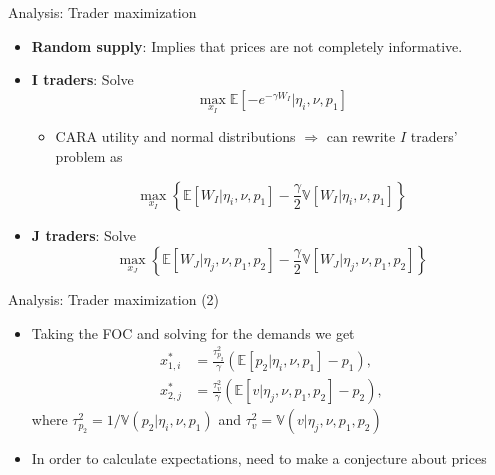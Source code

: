 \documentclass[english,10pt
,aspectratio=169
]{beamer}
\begin{document}
\begin{frame}{Analysis: Trader maximization}
	\begin{itemize}
		\item \textbf{Random supply}: Implies that prices are not completely informative.
		\item \textbf{I traders}: Solve
		\[
			\max_{x_I} \mathbb{E}\left[ -e^{-\gamma W_I}| \eta_i, \nu, p_1 \right]
		\]
		\begin{itemize}
			\item CARA utility and normal distributions $\Rightarrow$ can rewrite $I$ traders' problem as
		\end{itemize}
		\[
			\max_{x_I} \left\{\mathbb{E}\left[W_I| \eta_i, \nu, p_1\right]-\frac{\gamma}{2} \mathbb{V}\left[W_I| \eta_i, \nu, p_1\right]\right\}
		\]
		\item \textbf{J traders}: Solve
		\[
			\max_{x_J} \left\{\mathbb{E}\left[W_J| \eta_j, \nu, p_1, p_2\right]-\frac{\gamma}{2} \mathbb{V}\left[W_J| \eta_j, \nu, p_1, p_2\right] \right\}
		\]
	\end{itemize}
\end{frame}


\begin{frame}{Analysis: Trader maximization (2)}
	\begin{itemize}
		\item Taking the FOC and solving for the demands we get 
		\begin{align}
			x^*_{1,i} &= \frac{\tau^2_{p_2}}{\gamma}(\mathbb{E}[p_2| \eta_i, \nu, p_1]-p_1), \label{eqfoc1} \\
			x^*_{2,j} &= \frac{\tau^2_v}{\gamma} (\mathbb{E}[v| \eta_j, \nu, p_1, p_2]-p_2), \label{eqfoc2}
		\end{align}
		where $\tau^2_{p_2}=1/\mathbb{V}(p_2| \eta_i, \nu, p_1)$ and $\tau^2_{v}=\mathbb{V}(v| \eta_j, \nu, p_1, p_2)$
		\item In order to calculate expectations, need to make a conjecture about prices
	\end{itemize}
\end{frame}
\end{document}
